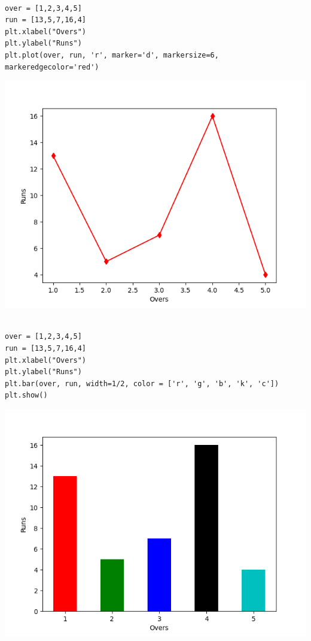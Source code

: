 \documentclass[11pt]{article}
\begin{document}
\newpage
\begin{verbatim}

over = [1,2,3,4,5]
run = [13,5,7,16,4]
plt.xlabel("Overs")
plt.ylabel("Runs")
plt.plot(over, run, 'r', marker='d', markersize=6, markeredgecolor='red')

\end{verbatim}

\begin{center}
\includegraphics[width=.9\linewidth]{fig2.png}
\end{center}

\newpage
\begin{verbatim}

over = [1,2,3,4,5]
run = [13,5,7,16,4]
plt.xlabel("Overs")
plt.ylabel("Runs")
plt.bar(over, run, width=1/2, color = ['r', 'g', 'b', 'k', 'c'])
plt.show()

\end{verbatim}

\begin{center}
\includegraphics[width=.9\linewidth]{fig3.png}
\end{center}
\end{document}
